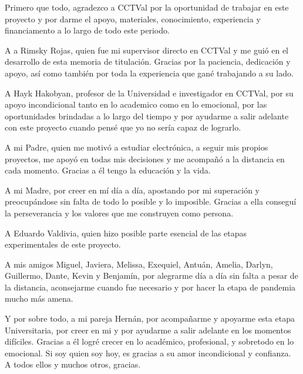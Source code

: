 
Primero que todo, agradezco a CCTVal por la oportunidad de trabajar en este proyecto y por darme el apoyo, materiales, conocimiento, experiencia y financiamento a lo largo de todo este periodo.

A a Rimsky Rojas, quien fue mi supervisor directo en CCTVal y me guió en el desarrollo de esta memoria de titulación. Gracias por la paciencia, dedicación y apoyo, así como también por toda la experiencia que gané trabajando a su lado.
 
A Hayk Hakobyan, profesor de la Universidad e investigador en CCTVal, por su apoyo incondicional tanto en lo academico como en lo emocional, por las oportunidades brindadas a lo largo del tiempo y por ayudarme a salir adelante con este proyecto cuando pensé que yo no sería capaz de lograrlo.

A mi Padre, quien me motivó a estudiar electrónica, a seguir mis propios proyectos, me apoyó en todas mis decisiones y me acompañó a la distancia en cada momento. Gracias a él tengo la educación y la vida.

A mi Madre, por creer en mí día a día, apostando por mi superación y preocupándose sin falta de todo lo posible y lo imposible. Gracias a ella conseguí la perseverancia y los valores que me construyen como persona.

A Eduardo Valdivia, quien hizo posible parte esencial de las etapas experimentales de este proyecto.

A mis amigos Miguel, Javiera, Melissa, Exequiel, Antuán,  Amelia, Darlyn, Guillermo, Dante, Kevin y Benjamín, por alegrarme día a día sin falta a pesar de la distancia, aconsejarme cuando fue necesario y por hacer la etapa de pandemia mucho más amena.

Y por sobre todo, a mi pareja Hernán, por acompañarme y apoyarme esta etapa Universitaria, por creer en mi y por ayudarme a salir adelante en los momentos difíciles. Gracias a él logré crecer en lo académico, profesional, y sobretodo en lo emocional. Si soy quien soy hoy, es gracias a su amor incondicional y confianza.
\\

A todos ellos y muchos otros, gracias.